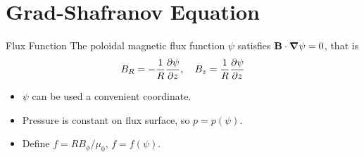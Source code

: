 \section{Grad-Shafranov Equation}
\begin{frame} {Flux Function}
  The poloidal magnetic flux function $\psi$ satisfies $\mathbf{B}\cdot\grad\psi = 0$, that is
  \begin{equation}
    B_R = -\frac{1}{R}\pdv{\psi}{z}, \quad B_z = \frac{1}{R}\pdv{\psi}{z}
    \label{eq:flux-function}
  \end{equation}

  \begin{itemize}
    \item $\psi$ can be used a convenient coordinate.
    \item Pressure is constant on flux surface, so $p = p(\psi)$.
    \item Define $f=RB_\phi/\mu_0$, $f = f(\psi)$.
  \end{itemize}
\end{frame}

